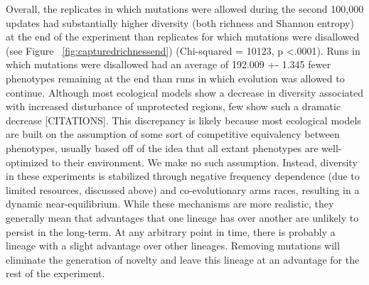 \documentclass[letterpaper]{article}
\begin{document}
Overall, the replicates in which mutations were allowed during the second 100,000 updates had substantially higher diversity (both richness and Shannon entropy) at the end of the experiment than replicates for which mutations were disallowed (see Figure ~\ref{fig:capturedrichnessend}) (Chi-squared = 10123, p \textless .0001). Runs in which mutations were disallowed had an average of 192.009 +- 1.345 fewer phenotypes remaining at the end than runs in which evolution was allowed to continue. Although most ecological models show a decrease in diversity associated with increased disturbance of unprotected regions, few show such a dramatic decrease [CITATIONS]. This discrepancy is likely because most ecological models are built on the assumption of some sort of competitive equivalency between phenotypes, usually based off of the idea that all extant phenotypes are well-optimized to their environment. We make no such assumption. Instead, diversity in these experiments is stabilized through negative frequency dependence (due to limited resources, discussed above) and co-evolutionary arms races, resulting in a dynamic near-equilibrium. While these mechanisms are more realistic, they generally mean that advantages that one lineage has over another are unlikely to persist in the long-term. At any arbitrary point in time, there is probably a lineage with a slight advantage over other lineages. Removing mutations will eliminate the generation of novelty and leave this lineage at an advantage for the rest of the experiment.
%
%
%
%
%
%
\end{document}
